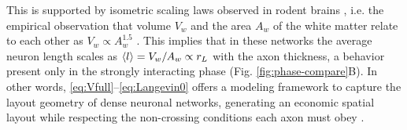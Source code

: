 \documentclass[nofootinbib,preprint,floatfix,titlepage,superscriptaddress]{revtex4} %
\newcommand{\finV}[2]{#2}
\begin{document}
This 
is supported by isometric scaling laws observed in rodent brains \cite{herculano2012remarkable}, i.e. the empirical observation that volume $V_w$ and the area $A_w$ of the white matter relate to each other as $V_w\propto A_w^{1.5}$ \cite{herculano2012remarkable}. 
This implies that in these networks the average neuron length scales as $ \left<l\right> = V_w/A_w \propto r_L $ with the axon thickness, a behavior present only in the strongly interacting phase %
(Fig. \ref{fig:phase-compare}B). 
In other words,  \eqref{eq:Vfull}--\eqref{eq:Langevin0} offers a modeling framework to capture the layout geometry of dense neuronal networks, generating an economic spatial layout %
\cite{bullmore2012economy,sporns2004organization} while respecting the non-crossing conditions each axon must obey \cite{kasthuri12015saturated}.


% 
% 


\finV{


}{}
\newpage
\newpage





\newpage

\end{document}
